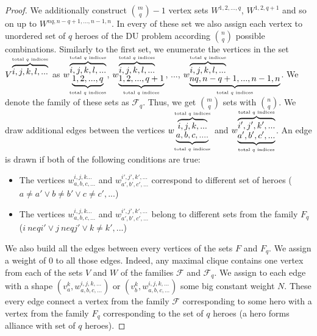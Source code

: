 \documentclass{article}
\begin{document}
\begin{proof}
We additionally construct $ \binom{m}{q}-1 $ vertex sets $ W^{1,2, ..., q} $, $W^{1,2, q + 1} $ and so on up to $ W^{nq, n-q + 1, ..., n-1, n} $. In every of these set we also assign each vertex to unordered set of $q$ heroes of the DU problem according  $\binom{n}{q}$ possible combinations. Similarly to the first set, we enumerate the vertices in the set $V^{\overbrace {i, j, k, l, ...}^\text {total $ q $ indices}} $ as $w_{\underbrace {1,2, ..., q}_\text {total $ q $ indices}}^{\overbrace{i, j, k, l, ...}^\text{total $ q $ indices}} $, $w_{ \underbrace {1,2, ..., q + 1}_\text{total $ q $ indices}}^{\overbrace{i, j, k, l, ...} ^\text{total $ q $ indices}} $,  ..., $w_{\underbrace {nq, n-q + 1, ..., n-1, n}_\text{total $ q $ indices}}^{\overbrace { i, j, k, l, ...}^\text {total $ q $ indices}} $.
    We denote the family of these sets as $ \mathcal {F} _q $. Thus, we get $ \binom{m}{q} $ sets with $ \binom{n}{q} $.
    We draw additional edges between the vertices $w_{\underbrace{a, b, c, ....}_\text{total $ q $ indices}}^{\overbrace{i, j, k , ...}^\text{total $ q $ indices}} $ and $w_{\underbrace{a',b', c', ...}_\text{total $ q $ indices}}^{\overbrace {i ', j', k ', ...}^\text{total $ q $ indices}}$. An edge is drawn if both of the following conditions are true:
    \begin{itemize}
        \item The vertices $w_{a, b, c, ...}^{i, j, k ...} $ and $ w_ {a', b', c', ...}^{i', j', k', ...}$ correspond to different set of heroes ($ a \neq a '\lor b \neq b' \lor c \neq c', ... $)
        \item The vertices $ w_{a, b, c, ...}^ {i, j, k ...} $ and $ w_{a', b', c',...}^{i', j', k', ...} $ belong to different sets from the family $ F_q $ ($ i \ neq i'\lor j \ neq j' \lor k \neq k', ... $)
    \end {itemize}
    
    We also build all the edges between every vertices of the sets $ F $ and $ F_q $. We assign a weight of 0 to all those edges. Indeed, any maximal clique contains one vertex from each of the sets $ V $ and $ W $ of the families $\mathcal {F}$ and $\mathcal {F}_q$. We assign to each edge with a shape $ (v_a^k, w_ {a, b, c, ...}^ {i, j, k, ...}) $ or $ (v_b^k, w_{a, b, c , ...}^{i, j, k, ...}) $ some big constant weight $ N $. These every edge connect a vertex from the family $ \mathcal{F} $ corresponding to some hero with a vertex from the family $ F_q $ corresponding to the set of $ q $ heroes (a hero forms alliance with set of $q$ heroes). 
    

\end{proof}
\end{document}
